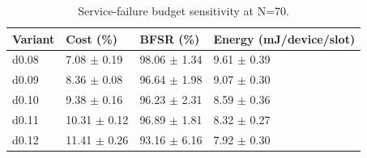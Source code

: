 \begin{table}[t]
\centering
\caption{Service-failure budget sensitivity at N=70.}
\label{tab:budget_sensitivity}
\begin{tabular}{llll}
\toprule
Variant & Cost (\%) & BFSR (\%) & Energy (mJ/device/slot) \\
\midrule
d0.08 & 7.08 $\pm$ 0.19 & 98.06 $\pm$ 1.34 & 9.61 $\pm$ 0.39 \\
d0.09 & 8.36 $\pm$ 0.08 & 96.64 $\pm$ 1.98 & 9.07 $\pm$ 0.30 \\
d0.10 & 9.38 $\pm$ 0.16 & 96.23 $\pm$ 2.31 & 8.59 $\pm$ 0.36 \\
d0.11 & 10.31 $\pm$ 0.12 & 96.89 $\pm$ 1.81 & 8.32 $\pm$ 0.27 \\
d0.12 & 11.41 $\pm$ 0.26 & 93.16 $\pm$ 6.16 & 7.92 $\pm$ 0.30 \\
\bottomrule
\end{tabular}
\end{table}
